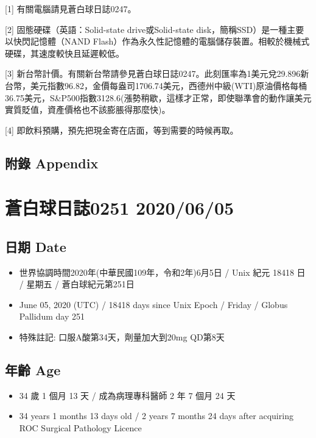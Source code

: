 \documentclass[
]{article}
\providecommand{\tightlist}{%
  \setlength{\itemsep}{0pt}\setlength{\parskip}{0pt}}
\begin{document}
{[}1{]} 有關電腦請見蒼白球日誌0247。

{[}2{]} 固態硬碟（英語：Solid-state drive或Solid-state
disk，簡稱SSD）是一種主要以快閃記憶體（NAND
Flash）作為永久性記憶體的電腦儲存裝置。相較於機械式硬碟，其速度較快且延遲較低。

{[}3{]}
新台幣計價。有關新台幣請參見蒼白球日誌0247。此刻匯率為1美元兌29.896新台幣，美元指數96.82，金價每盎司1706.74美元，西德州中級(WTI)原油價格每桶36.75美元，S\&P500指數3128.6(漲勢稍歇，這樣才正常，即使聯準會的動作讓美元實質貶值，資產價格也不該膨脹得那麼快)。

{[}4{]} 即飲料預購，預先把現金寄在店面，等到需要的時候再取。

\hypertarget{ux9644ux9304-appendix-3}{%
\subsection{附錄 Appendix}\label{ux9644ux9304-appendix-3}}

\hypertarget{ux84bcux767dux7403ux65e5ux8a8c0251-20200605}{%
\section{蒼白球日誌0251
2020/06/05}\label{ux84bcux767dux7403ux65e5ux8a8c0251-20200605}}

\hypertarget{ux65e5ux671f-date-4}{%
\subsection{日期 Date}\label{ux65e5ux671f-date-4}}

\begin{itemize}
\tightlist
\item
  世界協調時間2020年(中華民國109年，令和2年)6月5日 / Unix 紀元 18418 日
  / 星期五 / 蒼白球紀元第251日
\item
  June 05, 2020 (UTC) / 18418 days since Unix Epoch / Friday / Globus
  Pallidum day 251
\item
  特殊註記: 口服A酸第34天，劑量加大到20mg QD第8天
\end{itemize}

\hypertarget{ux5e74ux9f61-age-4}{%
\subsection{年齡 Age}\label{ux5e74ux9f61-age-4}}

\begin{itemize}
\tightlist
\item
  34 歲 1 個月 13 天 / 成為病理專科醫師 2 年 7 個月 24 天
\item
  34 years 1 months 13 days old / 2 years 7 months 24 days after
  acquiring ROC Surgical Pathology Licence
\end{itemize}
\end{document}
